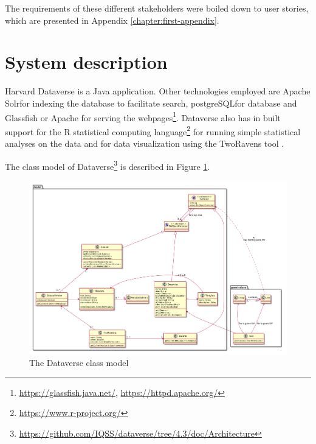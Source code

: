 The requirements of these different stakeholders were boiled down to user
stories, which are presented in Appendix \ref{chapter:first-appendix}.

\section{System description}
\label{sec:system_description}

Harvard Dataverse is a Java application. Other technologies employed are Apache
Solr for indexing the database to facilitate search,
postgreSQL for database
and Glassfish or Apache for serving the
webpages\footnote{\url{https://glassfish.java.net/}, \url{https://httpd.apache.org/}}.
Dataverse also has in built support for the R statistical computing
language\footnote{\url{https://www.r-project.org/}} for running simple
statistical analyses on the data and for data visualization using the
TwoRavens tool \cite{DBLP:conf/ht/HonakerD14}.

The class model of
Dataverse\footnote{\label{architecture}\url{https://github.com/IQSS/dataverse/tree/4.3/doc/Architecture}}
is described in Figure \ref{fig:dataverse-model}.

\begin{figure}
    \begin{centering}
        \includegraphics[width=\textwidth]{images/dataverse-model}
    \end{centering}
    \caption[The Dataverse class model]{The Dataverse class model}
    \label{fig:dataverse-model}
\end{figure}

